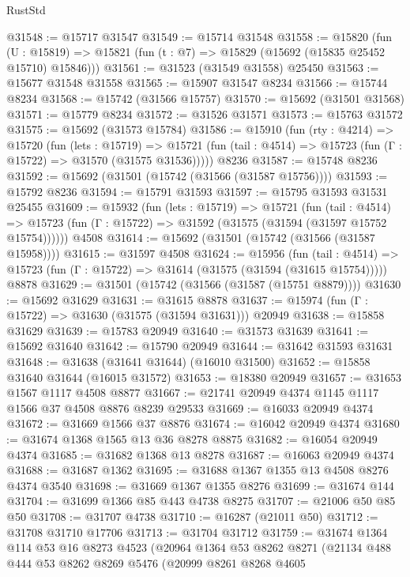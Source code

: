\begin{lexlean}{RustStd}
\begin{coremodule}
@31548 := @15717 @31547
@31549 := @15714 @31548
@31558 := @15820
    (fun (U : @15819) => @15821 (fun (t : @7) => @15829 (@15692 (@15835 @25452 @15710) @15846)))
@31561 := @31523 (@31549 @31558) @25450
@31563 := @15677 @31548 @31558
@31565 := @15907 @31547 @8234
@31566 := @15744 @8234
@31568 := @15742 (@31566 @15757)
@31570 := @15692 (@31501 @31568)
@31571 := @15779 @8234
@31572 := @31526 @31571
@31573 := @15763 @31572
@31575 := @15692 (@31573 @15784)
@31586 := @15910
    (fun (rty : @4214) =>
    @15720
      (fun (lets : @15719) =>
      @15721 (fun (tail : @4514) => @15723 (fun (Γ : @15722) => @31570 (@31575 @31536)))))
    @8236
@31587 := @15748 @8236
@31592 := @15692 (@31501 (@15742 (@31566 (@31587 @15756))))
@31593 := @15792 @8236
@31594 := @15791 @31593
@31597 := @15795 @31593 @31531 @25455
@31609 := @15932
    (fun (lets : @15719) =>
    @15721
      (fun (tail : @4514) =>
      @15723 (fun (Γ : @15722) => @31592 (@31575 (@31594 (@31597 @15752 @15754))))))
    @4508
@31614 := @15692 (@31501 (@15742 (@31566 (@31587 @15958))))
@31615 := @31597 @4508
@31624 := @15956
    (fun (tail : @4514) => @15723 (fun (Γ : @15722) => @31614 (@31575 (@31594 (@31615 @15754)))))
    @8878
@31629 := @31501 (@15742 (@31566 (@31587 (@15751 @8879))))
@31630 := @15692 @31629
@31631 := @31615 @8878
@31637 := @15974 (fun (Γ : @15722) => @31630 (@31575 (@31594 @31631))) @20949
@31638 := @15858 @31629
@31639 := @15783 @20949
@31640 := @31573 @31639
@31641 := @15692 @31640
@31642 := @15790 @20949
@31644 := @31642 @31593 @31631
@31648 := @31638 (@31641 @31644) (@16010 @31500)
@31652 := @15858 @31640 @31644 (@16015 @31572)
@31653 := @18380 @20949
@31657 := @31653 @1567 @1117 @4508 @8877
@31667 := @21741 @20949 @4374 @1145 @1117 @1566 @37 @4508 @8876 @8239 @29533
@31669 := @16033 @20949 @4374
@31672 := @31669 @1566 @37 @8876
@31674 := @16042 @20949 @4374
@31680 := @31674 @1368 @1565 @13 @36 @8278 @8875
@31682 := @16054 @20949 @4374
@31685 := @31682 @1368 @13 @8278
@31687 := @16063 @20949 @4374
@31688 := @31687 @1362
@31695 := @31688 @1367 @1355 @13 @4508 @8276 @4374 @3540
@31698 := @31669 @1367 @1355 @8276
@31699 := @31674 @144
@31704 := @31699 @1366 @85 @443 @4738 @8275
@31707 := @21006 @50 @85 @50
@31708 := @31707 @4738
@31710 := @16287 (@21011 @50)
@31712 := @31708 @31710 @17706
@31713 := @31704 @31712
@31759 := @31674
    @1364
    @114
    @53
    @16
    @8273
    @4523
    (@20964
      @1364
      @53
      @8262
      @8271
      (@21134
        @488
        @444
        @53
        @8262
        @8269
        @5476
        (@20999
          @8261
          @8268
          @4605

\end{coremodule}
\end{lexlean}
